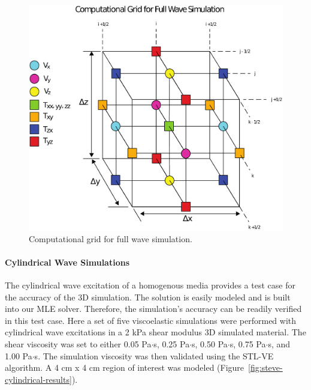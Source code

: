 \begin{figure}[htb!]
    \centering
    \includegraphics[width=0.75\linewidth]{steve/figs/image11.png}
    \caption{Computational grid for full wave simulation.} 
\label{fig:steve-full-wave-grid}
\end{figure}

\paragraph{Cylindrical Wave Simulations}
The cylindrical wave excitation of a homogenous media provides a test case for
the accuracy of the 3D simulation. The solution is easily modeled and is built
into our MLE solver. Therefore, the simulation’s accuracy can be readily
verified in this test case. Here a set of five viscoelastic simulations were
performed with cylindrical wave excitations in a 2 kPa shear modulus 3D
simulated material. The shear viscosity was set to either 0.05 Pa$\cdot$s, 0.25
Pa$\cdot$s, 0.50 Pa$\cdot$s, 0.75 Pa$\cdot$s, and 1.00 Pa$\cdot$s. The
simulation viscosity was then validated using the STL-VE algorithm. A 4 cm x 4
cm region of interest was modeled (Figure~\ref{fig:steve-cylindrical-results}). 

